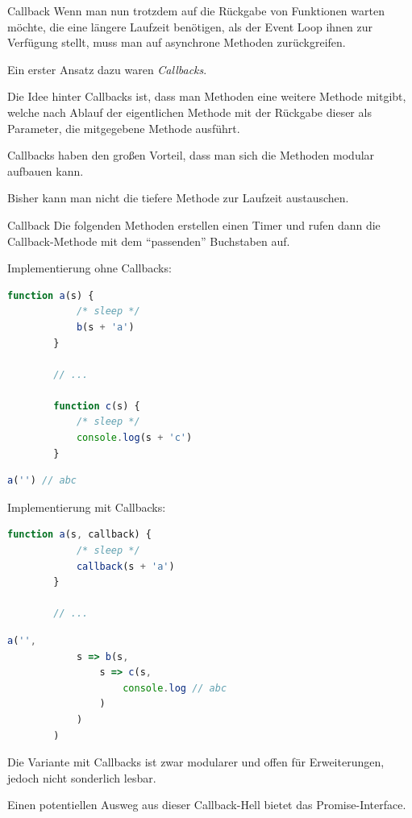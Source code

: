 \begin{defi}{Callback}
    Wenn man nun trotzdem auf die Rückgabe von Funktionen warten möchte, die eine längere Laufzeit benötigen, als der Event Loop ihnen zur Verfügung stellt, muss man auf asynchrone Methoden zurückgreifen.

    Ein erster Ansatz dazu waren \emph{Callbacks}.

    Die Idee hinter Callbacks ist, dass man Methoden eine weitere Methode mitgibt, welche nach Ablauf der eigentlichen Methode mit der Rückgabe dieser als Parameter, die mitgegebene Methode ausführt.

    Callbacks haben den großen Vorteil, dass man sich die Methoden modular aufbauen kann.

    Bisher kann man nicht die tiefere Methode zur Laufzeit austauschen.
\end{defi}

\begin{example}{Callback}
    Die folgenden Methoden erstellen einen Timer und rufen dann die Callback-Methode mit dem \enquote{passenden} Buchstaben auf.

    Implementierung ohne Callbacks:
    \begin{lstlisting}[language=JavaScript]
        function a(s) {
            /* sleep */
            b(s + 'a')
        }

        // ...

        function c(s) {
            /* sleep */
            console.log(s + 'c')
        }
    \end{lstlisting}

    \begin{lstlisting}[language=JavaScript]
        a('') // abc
    \end{lstlisting}

    Implementierung mit Callbacks:
    \begin{lstlisting}[language=JavaScript]
        function a(s, callback) {
            /* sleep */
            callback(s + 'a')
        }

        // ...
    \end{lstlisting}

    \begin{lstlisting}[language=JavaScript]
        a('',
            s => b(s,
                s => c(s, 
                    console.log // abc
                )
            )
        )
    \end{lstlisting}

    Die Variante mit Callbacks ist zwar modularer und offen für Erweiterungen, jedoch nicht sonderlich lesbar.

    Einen potentiellen Ausweg aus dieser Callback-Hell bietet das Promise-Interface.
\end{example}

